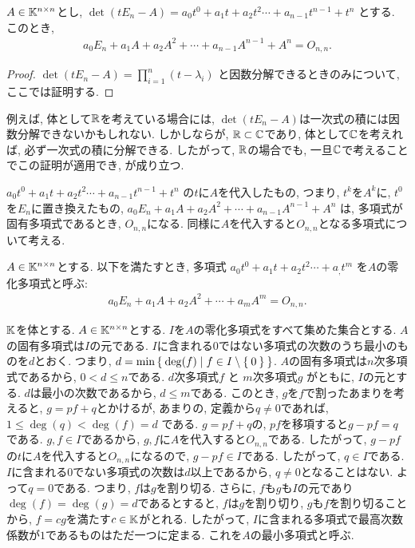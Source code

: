 \begin{prop}
\label{prop:chthm}
$A\in \mathbb{K}^{n\times n}$とし,
$\det(tE_n-A)=a_0t^0+a_1t+a_2t^2\cdots+a_{n-1}t^{n-1}+t^n$
とする.
このとき,
\begin{align*}
a_0E_n+a_1A+a_2A^2+\cdots+a_{n-1}A^{n-1}+A^n=O_{n,n}.
\end{align*}
\end{prop}
\begin{proof}
$\det(tE_n-A)=\prod_{i=1}^n (t-\lambda_i)$
と因数分解できるときのみについて,
ここでは証明する.
\end{proof}
\begin{remark}
例えば,
体として$\mathbb{R}$を考えている場合には,
$\det(tE_n-A)$は一次式の積には因数分解できないかもしれない.
しかしならが,
$\mathbb{R}\subset\mathbb{C}$であり,
体として$\mathbb{C}$を考えれば,
必ず一次式の積に分解できる.
したがって,
$\mathbb{R}$の場合でも, 一旦$\mathbb{C}$で考えることでこの証明が適用でき,
が成り立つ.
\end{remark}
$a_0t^0+a_1t+a_2t^2\cdots+a_{n-1}t^{n-1}+t^n$
の$t$に$A$を代入したもの, つまり, $t^k$を$A^k$に, $t^0$を$E_n$に置き換えたもの,
$a_0E_n+a_1A+a_2A^2+\cdots+a_{n-1}A^{n-1}+A^n$
は,
多項式が固有多項式であるとき, $O_{n,n}$になる.
同様に$A$を代入すると$O_{n,n}$となる多項式について考える.
\begin{definition}
$A\in\mathbb{K}^{n\times n}$とする.
以下を満たすとき,
多項式
$a_0t^0+a_1t+a_2t^2\cdots+a_{,}t^{m}$
を$A$の零化多項式と呼ぶ:
\begin{align*}
a_0E_n+a_1A+a_2A^2+\cdots+a_mA^m=O_{n,n}.
\end{align*}
\end{definition}

$\mathbb{K}$を体とする.
$A\in\mathbb{K}^{n\times n}$とする.
$I$を$A$の零化多項式をすべて集めた集合とする.
$A$の固有多項式は$I$の元である.
$I$に含まれる$0$ではない多項式の次数のうち最小のものを$d$とおく.
つまり,
$d=\min\Set{ \deg(f) |f \in I\setminus\Set{0}}$.
$A$の固有多項式は$n$次多項式であるから,
$0<d\leq n$である.
$d$次多項式$f$
と
$m$次多項式$g$
がともに, $I$の元とする.
$d$は最小の次数であるから,
$d\leq m$である.
このとき,
$g$を$f$で割ったあまりを考えると,
$g=pf+q$とかけるが,
あまりの, 定義から$q\neq 0$であれば, $1\leq \deg(q)<\deg(f)=d$
である.
$g=pf+q$の, $pf$を移項すると$g-pf=q$である.
$g,f\in I$であるから, $g,f$に$A$を代入すると$O_{n,n}$である.
したがって,
$g-pf$の$t$に$A$を代入すると$O_{n,n}$になるので,
$g-pf\in I$である.
したがって, $q\in I$である.
$I$に含まれる$0$でない多項式の次数は$d$以上であるから,
$q\neq 0$となることはない.
よって$q=0$である.
つまり, $f$は$g$を割り切る.
さらに, $f$も$g$も$I$の元であり$\deg(f)=\deg(g)=d$であるとすると,
$f$は$g$を割り切り, $g$も$f$を割り切ることから,
$f=cg$を満たす$c\in\mathbb{K}$がとれる.
したがって,
$I$に含まれる多項式で最高次数係数が$1$であるものはただ一つに定まる.
これを$A$の最小多項式と呼ぶ.

